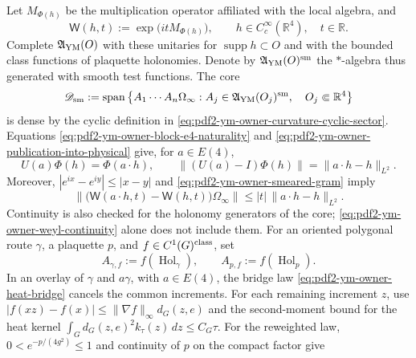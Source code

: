 Let $M_{\Phi(h)}$ be the multiplication operator affiliated with the local algebra, and
\begin{equation}\label{eq:pdf2-ym-owner-curvature-weyl}
 \mathsf W(h,t):=\exp\!\bigl(itM_{\Phi(h)}\bigr),
 \qquad h\in C_c^\infty(\mathbb R^4),\quad t\in\mathbb R.
\end{equation}
Complete $\mathfrak A_{\rm YM}(O)$ with these unitaries for
$\operatorname{supp}h\subset O$ and with the bounded class functions of
plaquette holonomies. Denote by $\mathfrak A_{\rm YM}(O)^{\rm sm}$ the
$*$-algebra thus generated with smooth test functions. The core
\begin{equation}\label{eq:pdf2-ym-owner-smooth-core}
 \mathscr D_{\rm sm}:=\operatorname{span}\left\{
 A_1\cdots A_n\Omega_\infty:
 A_j\in\mathfrak A_{\rm YM}(O_j)^{\rm sm},\quad
 O_j\Subset\mathbb R^4\right\}
\end{equation}
is dense by the cyclic definition in
\eqref{eq:pdf2-ym-owner-curvature-cyclic-sector}. Equations
\eqref{eq:pdf2-ym-owner-block-e4-naturality} and
\eqref{eq:pdf2-ym-owner-publication-into-physical} give, for $a\in E(4)$,
\begin{equation}\label{eq:pdf2-ym-owner-field-e4-covariance}
 U(a)\Phi(h)=\Phi(a\!\cdot h),
 \qquad
 \|(U(a)-I)\Phi(h)\|=\|a\!\cdot h-h\|_{L^2}.
\end{equation}
Moreover, $|e^{ix}-e^{iy}|\le|x-y|$ and
\eqref{eq:pdf2-ym-owner-smeared-gram} imply
\begin{equation}\label{eq:pdf2-ym-owner-weyl-continuity}
 \|\bigl(\mathsf W(a\!\cdot h,t)-\mathsf W(h,t)\bigr)\Omega_\infty\|
 \le |t|\,\|a\!\cdot h-h\|_{L^2}.
\end{equation}
Continuity is also checked for the holonomy generators of the core;
\eqref{eq:pdf2-ym-owner-weyl-continuity} alone does not include them. For an oriented polygonal route $\gamma$,
a plaquette $p$, and $f\in C^1(G)^{\rm class}$, set
\begin{equation}\label{eq:pdf2-ym-owner-holonomy-core-generators}
 A_{\gamma,f}:=f(\operatorname{Hol}_\gamma),
 \qquad A_{p,f}:=f(\operatorname{Hol}_p).
\end{equation}
In an overlay of $\gamma$ and $a\gamma$, with $a\in E(4)$, the bridge law
\eqref{eq:pdf2-ym-owner-heat-bridge} cancels the common increments. For each
remaining increment $z$, use
$|f(xz)-f(x)|\le\|\nabla f\|_\infty d_G(z,e)$ and the second-moment bound for the
heat kernel
\(
 \int_Gd_G(z,e)^2k_\tau(z)\,dz\le C_G\tau
\).
For the reweighted law, $0<e^{-p/(4g^2)}\le1$ and continuity of $p$ on the
compact factor give
